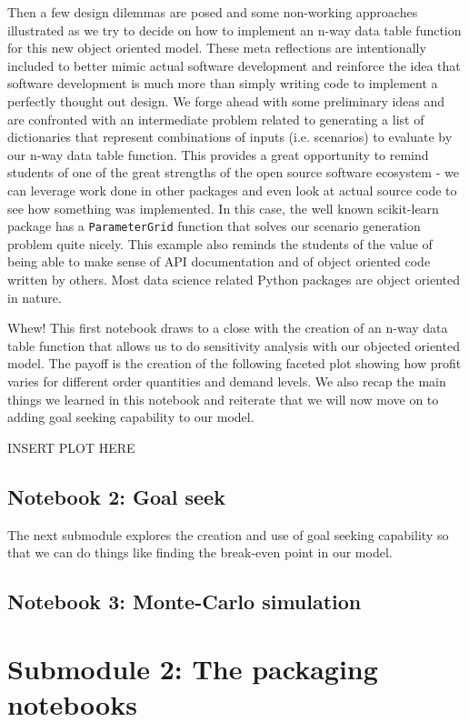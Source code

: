 \documentclass[ited,blindrev]{informs3}              %
\newcommand{\code}[1]{\texttt{#1}}
\begin{document}
Then a few design dilemmas are posed and some non-working approaches illustrated as we try to decide on how to implement an n-way data table function for this new object oriented model. These meta reflections are intentionally included to better mimic actual software development and reinforce the idea that software development is much more than simply writing code to implement a perfectly thought out design. We forge ahead with some preliminary ideas and are confronted with an intermediate problem related to generating a list of dictionaries that represent combinations of inputs (i.e. scenarios) to evaluate by our n-way data table function. This provides a great opportunity to remind students of one of the great strengths of the open source software ecosystem - we can leverage work done in other packages and even look at actual source code to see how something was implemented. In this case, the well known scikit-learn package has a \code{ParameterGrid} function that solves our scenario generation problem quite nicely. This example also reminds the students of the value of being able to make sense of API documentation and of object oriented code written by others. Most data science related Python packages are object oriented in nature. 

Whew! This first notebook draws to a close with the creation of an n-way data table function that allows us to do sensitivity analysis with our objected oriented model. The payoff is the creation of the following faceted plot showing how profit varies for different order quantities and demand levels. We also recap the main things we learned in this notebook and reiterate that we will now move on to adding goal seeking capability to our model.

INSERT PLOT HERE


\subsection{Notebook 2: Goal seek}

The next submodule explores the creation and use of goal seeking capability so that we can do things like finding the break-even point in our model.
 
\subsection{Notebook 3: Monte-Carlo simulation}

\section{Submodule 2: The packaging notebooks}
\end{document}
